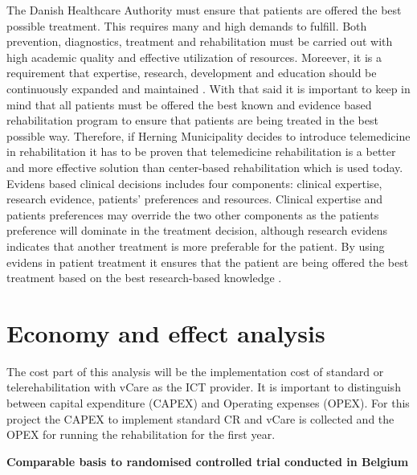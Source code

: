 The Danish Healthcare Authority must ensure that patients are offered the best possible treatment. This requires many and high demands to fulfill. Both prevention, diagnostics, treatment and rehabilitation must be carried out with high academic quality and effective utilization of resources. Moreever, it is a requirement that expertise, research, development and education should be continuously expanded and maintained \cite{plan}. With that said it is important to keep in mind that all patients must be offered the best known and evidence based rehabilitation program to ensure that patients are being treated in the best possible way. Therefore, if Herning Municipality decides to introduce telemedicine in rehabilitation it has to be proven that telemedicine rehabilitation is a better and more effective solution than center-based rehabilitation which is used today. Evidens based clinical decisions includes four components: clinical expertise, research evidence, patients' preferences and resources. Clinical expertise and patients preferences may override the two other components as the patients preference will dominate in the treatment decision, although research evidens indicates that another treatment is more preferable for the patient. By using evidens in patient treatment it ensures that the patient are being offered the best treatment based on the best research-based knowledge \cite{evidence}.            


\section{Economy and effect analysis}

The cost part of this analysis will be the implementation cost of standard or telerehabilitation with vCare as the ICT provider. It is important to distinguish between capital expenditure (CAPEX) and Operating expenses (OPEX). For this project the CAPEX to implement standard CR and vCare is collected and the OPEX for running the rehabilitation for the first year. 

\textbf{Comparable basis to randomised controlled trial conducted in Belgium} \label{belgium}

